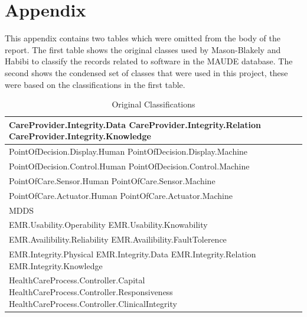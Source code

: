 \documentclass[11pt, notitlepage,abstracton,oneside]{article}   	%
\begin{document}
\section{Appendix}
This appendix contains two tables which were omitted from the body of the report. The first table shows the original classes used by Mason-Blakely and Habibi to classify the records related to software in the MAUDE database. The second shows the condensed set of classes that were used in this project, these were based on the classifications in the first table. 

\begin{table}[ht]
\caption{Original Classifications}
\label{tab:OriginalClassifications}
\begin{center}
\begin{tabular}{|p{80mm}|}
\hline
CareProvider.Integrity.Data \newline CareProvider.Integrity.Relation \newline CareProvider.Integrity.Knowledge \\ \hline
PointOfDecision.Display.Human \newline PointOfDecision.Display.Machine \\ \hline
PointOfDecision.Control.Human \newline PointOfDecision.Control.Machine \\ \hline
PointOfCare.Sensor.Human \newline PointOfCare.Sensor.Machine \\ \hline
PointOfCare.Actuator.Human \newline PointOfCare.Actuator.Machine \\ \hline
MDDS \\ \hline
EMR.Usability.Operability \newline EMR.Usability.Knowability \\ \hline
EMR.Availibility.Reliability \newline EMR.Availibility.FaultTolerence \\ \hline
EMR.Integrity.Physical \newline EMR.Integrity.Data \newline EMR.Integrity.Relation \newline EMR.Integrity.Knowledge \\ \hline
HealthCareProcess.Controller.Capital \newline HealthCareProcess.Controller.Responsiveness \newline HealthCareProcess.Controller.ClinicalIntegrity \\ \hline

\end{tabular}
\end{center}
\end{table}
\end{document}
